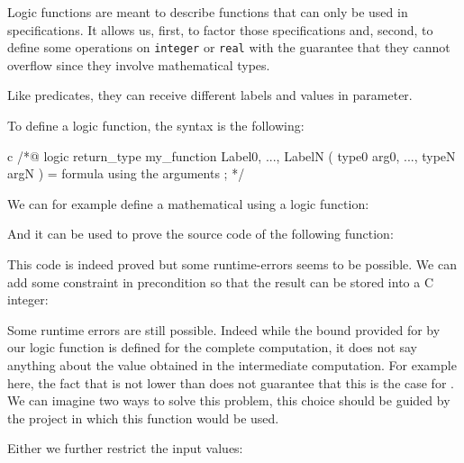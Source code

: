 Logic functions are meant to describe functions that can only be used in
specifications. It allows us, first, to factor those specifications and,
second, to define some operations on \texttt{integer} or \texttt{real}
with the guarantee that they cannot overflow since they involve mathematical
types.

Like predicates, they can receive different labels and values in
parameter.





To define a logic function, the syntax is the following:



\begin{CodeBlock}{c}
/*@
  logic return_type my_function{ Label0, ..., LabelN }( type0 arg0, ..., typeN argN ) =
    formula using the arguments ;
*/
\end{CodeBlock}



We can for example define a mathematical  using a logic function:






And it can be used to prove the source code of the following function:








This code is indeed proved but some runtime-errors seems to be possible.
We can add some constraint in precondition so that the result can be
stored into a C integer:




Some runtime errors are still possible. Indeed while the bound provided
for  by our logic function is defined for the complete
computation, it does not say anything about the value obtained in the
intermediate computation. For example here, the fact that
 is not lower than  does not
guarantee that this is the case for . We can imagine
two ways to solve this problem, this choice should be guided by the
project in which this function would be used.


Either we further restrict the input values:


